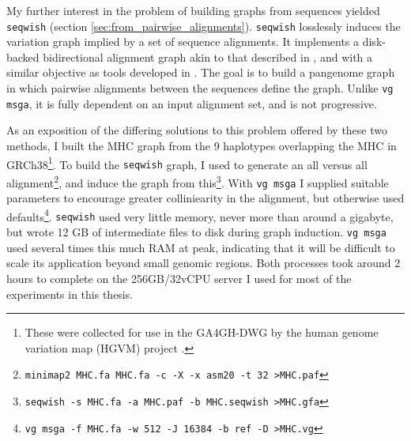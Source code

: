 \documentclass[a4paper,12pt,numbered,oneside]{Classes/PhDThesisPSnPDF}
\begin{document}
My further interest in the problem of building graphs from sequences yielded {\tt seqwish} (section \ref{sec:from_pairwise_alignments}).
{\tt seqwish} losslessly induces the variation graph implied by a set of sequence alignments.
It implements a disk-backed bidirectional alignment graph akin to that described in \cite{kehr2014genome}, and with a similar objective as tools developed in \cite{jandrasits2018seq}.
The goal is to build a pangenome graph in which pairwise alignments between the sequences define the graph.
Unlike {\tt vg msga}, it is fully dependent on an input alignment set, and is not progressive.

As an exposition of the differing solutions to this problem offered by these two methods, I built the MHC graph from the 9 haplotypes overlapping the MHC in GRCh38\footnote{These were collected for use in the GA4GH-DWG by the human genome variation map (HGVM) project \cite{blow2015decoding}.}.
To build the {\tt seqwish} graph, I used \cite{li2018minimap2} to generate an all versus all alignment\footnote{{\tt minimap2 MHC.fa MHC.fa -c -X -x asm20 -t 32 >MHC.paf}}, and induce the graph from this\footnote{{\tt seqwish -s MHC.fa -a MHC.paf -b MHC.seqwish >MHC.gfa}}.
With {\tt vg msga} I supplied suitable parameters to encourage greater colliniearity in the alignment, but otherwise used defaults\footnote{{\tt vg msga -f MHC.fa -w 512 -J 16384 -b ref -D >MHC.vg}}.
{\tt seqwish} used very little memory, never more than around a gigabyte, but wrote 12 GB of intermediate files to disk during graph induction.
{\tt vg msga} used several times this much RAM at peak, indicating that it will be difficult to scale its application beyond small genomic regions.
Both processes took around 2 hours to complete on the 256GB/32vCPU server I used for most of the experiments in this thesis.
\end{document}
